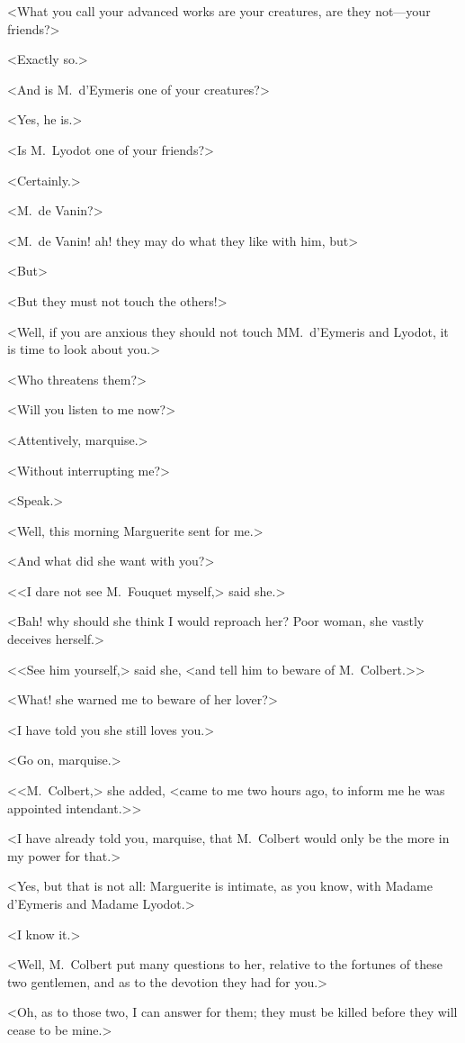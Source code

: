 <What you call your advanced works are your creatures, are they not—your friends?>

<Exactly so.>

<And is M.~d'Eymeris one of your creatures?>

<Yes, he is.>

<Is M.~Lyodot one of your friends?>

<Certainly.>

<M.~de Vanin?>

<M.~de Vanin! ah! they may do what they like with him, but\longdash>

<But\longdash>

<But they must not touch the others!>

<Well, if you are anxious they should not touch MM.~d'Eymeris and Lyodot, it is time to look about you.>

<Who threatens them?>

<Will you listen to me now?>

<Attentively, marquise.>

<Without interrupting me?>

<Speak.>

<Well, this morning Marguerite sent for me.>

<And what did she want with you?>

<<I dare not see M.~Fouquet myself,> said she.>

<Bah! why should she think I would reproach her? Poor woman, she vastly deceives herself.>

<<See him yourself,> said she, <and tell him to beware of M.~Colbert.>>

<What! she warned me to beware of her lover?>

<I have told you she still loves you.>

<Go on, marquise.>

<<M.~Colbert,> she added, <came to me two hours ago, to inform me he was appointed intendant.>>

<I have already told you, marquise, that M.~Colbert would only be the more in my power for that.>

<Yes, but that is not all: Marguerite is intimate, as you know, with Madame d'Eymeris and Madame Lyodot.>

<I know it.>

<Well, M.~Colbert put many questions to her, relative to the fortunes of these two gentlemen, and as to the devotion they had for you.>

<Oh, as to those two, I can answer for them; they must be killed before they will cease to be mine.>

